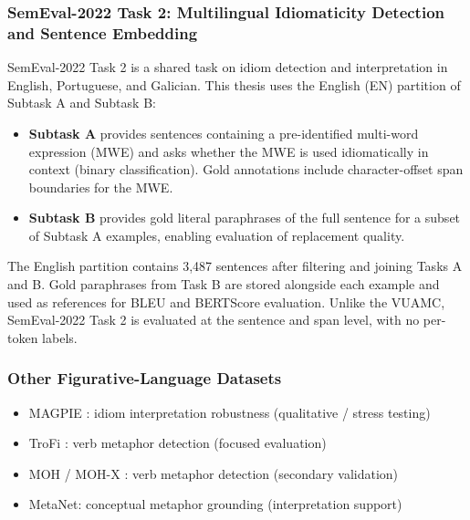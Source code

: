 \subsubsection{SemEval-2022 Task 2: Multilingual Idiomaticity Detection and Sentence Embedding}

SemEval-2022 Task 2 \cite{tayyar-madabushi-etal-2022-semeval} is a shared task on idiom detection and interpretation in English, Portuguese, and Galician. This thesis uses the English (EN) partition of Subtask A and Subtask B:
\begin{itemize}
    \item \textbf{Subtask A} provides sentences containing a pre-identified multi-word expression (MWE) and asks whether the MWE is used idiomatically in context (binary classification). Gold annotations include character-offset span boundaries for the MWE.
    \item \textbf{Subtask B} provides gold literal paraphrases of the full sentence for a subset of Subtask A examples, enabling evaluation of replacement quality.
\end{itemize}

The English partition contains 3{,}487 sentences after filtering and joining Tasks A and B. Gold paraphrases from Task B are stored alongside each example and used as references for BLEU and BERTScore evaluation. Unlike the VUAMC, SemEval-2022 Task 2 is evaluated at the sentence and span level, with no per-token labels.

\subsubsection{Other Figurative-Language Datasets}
\begin{itemize}
    \item MAGPIE \cite{magpie}: idiom interpretation robustness (qualitative / stress testing)
    \item TroFi \cite{trofi}: verb metaphor detection (focused evaluation)
    \item MOH / MOH-X \cite{moh}: verb metaphor detection (secondary validation)
    \item MetaNet: conceptual metaphor grounding (interpretation support)
\end{itemize}

